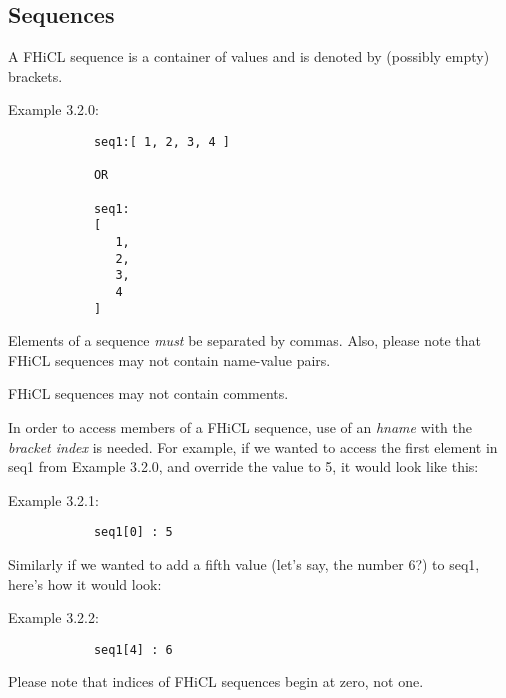 \documentclass{memarticle}
\begin{document}
	\subsection{Sequences}
		A FHiCL sequence is a container of values
		and is denoted by (possibly empty) brackets.
		\par
		Example 3.2.0:
		\begin{verbatim}
			seq1:[ 1, 2, 3, 4 ]
			
			OR

			seq1:
			[
			   1,
			   2,
			   3,
			   4
			]
		\end{verbatim}
		\par
		Elements of a sequence \emph{must} be separated by commas.
		Also, please note that FHiCL sequences may not contain name-value pairs.
		\par
		FHiCL sequences may not contain comments.
		\par
		In order to access members of a FHiCL sequence, use of an \emph{hname}
		with the \emph{bracket index} is needed.
		For example, if we wanted to access the first element in seq1 from Example 3.2.0,
		and override the value to 5, it would look like this:
		\par
		Example 3.2.1:
		\begin{verbatim}
			seq1[0] : 5
		\end{verbatim}
		\par
		Similarly if we wanted to add a fifth value (let's say, the number 6?) to seq1,
		here's how it would look:
		\par
		Example 3.2.2:
		\begin{verbatim}
			seq1[4] : 6
		\end{verbatim}
		\par
		Please note that indices of FHiCL sequences begin at zero, not one.	
\end{document}

